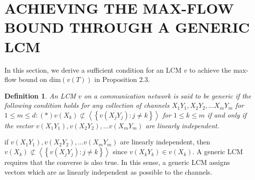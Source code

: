 \documentclass{IEEEtran}
\newtheorem{defi}{Definition}
\begin{document}
\section{ACHIEVING THE MAX-FLOW BOUND THROUGH A GENERIC LCM}\label{sec: achieving}
\par
In this section, we derive a sufficient condition for an LCM $v$ to achieve the max-flow bound on $\text{dim}(v(T))$ in Proposition 2.3.
\begin{defi}
	An LCM $v$ on a communication network is said to be \emph{generic} if the following condition holds for any collection of channels $X_1Y_1, X_2Y_2, \dots X_mY_m$ for $1\leq m \leq d: (*)v(X_k)\nsubset \left \langle \left \{ v(X_jY_j):j \neq k\right \} \right \rangle$ for $1\leq k \leq m$ if and only if the vector $v(X_1Y_1), v(X_2Y_2), \dots v(X_mY_m)$ are linearly independent.
\end{defi}
\par
if $v(X_1Y_1), v(X_2Y_2), \dots v(X_mY_m)$ are linearly independent, then $v(X_k)\nsubset \left \langle \left \{ v(X_jY_j):j \neq k\right \} \right \rangle$ since $v(X_kY_k)\in v(X_k)$. A generic LCM requires that the converse is also true. In this sense, a generic LCM assigns vectors which are as linearly independent as possible to the channels.
\end{document}
